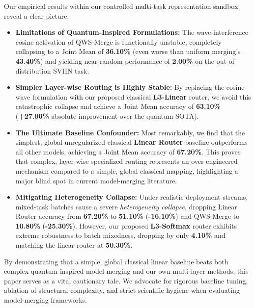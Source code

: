 Our empirical results within our controlled multi-task representation sandbox reveal a clear picture:
\begin{itemize}
    \item \textbf{Limitations of Quantum-Inspired Formulations:} The wave-interference cosine activation of QWS-Merge is functionally unstable, completely collapsing to a Joint Mean of \textbf{36.10\%} (even worse than uniform merging's \textbf{43.40\%}) and yielding near-random performance of \textbf{2.00\%} on the out-of-distribution SVHN task.
    \item \textbf{Simpler Layer-wise Routing is Highly Stable:} By replacing the cosine wave formulation with our proposed classical \textbf{L3-Linear} router, we avoid this catastrophic collapse and achieve a Joint Mean accuracy of \textbf{63.10\%} (\textbf{+27.00\%} absolute improvement over the quantum SOTA).
    \item \textbf{The Ultimate Baseline Confounder:} Most remarkably, we find that the simplest, global unregularized classical \textbf{Linear Router} baseline outperforms all other models, achieving a Joint Mean accuracy of \textbf{67.20\%}. This proves that complex, layer-wise specialized routing represents an over-engineered mechanism compared to a simple, global classical mapping, highlighting a major blind spot in current model-merging literature.
    \item \textbf{Mitigating Heterogeneity Collapse:} Under realistic deployment streams, mixed-task batches cause a severe \textit{heterogeneity collapse}, dropping Linear Router accuracy from \textbf{67.20\%} to \textbf{51.10\%} (\textbf{-16.10\%}) and QWS-Merge to \textbf{10.80\%} (\textbf{-25.30\%}). However, our proposed \textbf{L3-Softmax} router exhibits extreme robustness to batch mixedness, dropping by only \textbf{4.10\%} and matching the linear router at \textbf{50.30\%}.
\end{itemize}

By demonstrating that a simple, global classical linear baseline beats both complex quantum-inspired model merging and our own multi-layer methods, this paper serves as a vital cautionary tale. We advocate for rigorous baseline tuning, ablation of structural complexity, and strict scientific hygiene when evaluating model-merging frameworks.
